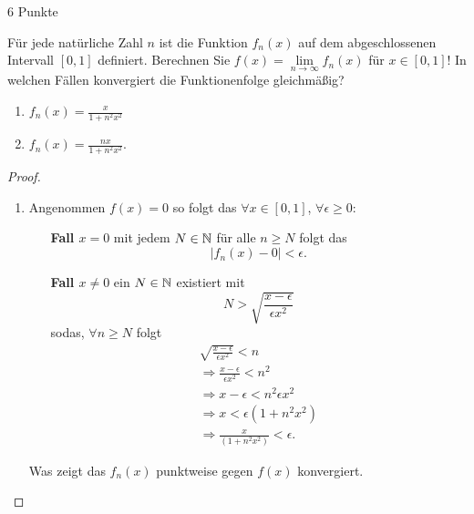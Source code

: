 \documentclass{problemset}
\author{Michael van Straten}
\begin{document}
\maketitle

\begin{problem}{6 Punkte}

Für jede natürliche Zahl $n$ ist die Funktion $f_n(x)$ auf dem abgeschlossenen
Intervall $[0, 1]$ definiert. Berechnen Sie $f(x) = \lim\limits_{n \to \infty}
f_n(x)$ für $x \in [0, 1]$! In welchen Fällen konvergiert die Funktionenfolge
gleichmäßig?

\begin{enumerate}
    \item $f_n(x) = \frac{x}{1 + n^2x^2}$
    \item $f_n(x) = \frac{nx}{1 + n^2x^2}$.
\end{enumerate}

\begin{proof}
    \leavevmode
    \begin{enumerate}
        \item Angenommen \(f(x) = 0\) so folgt das \(\forall x \in
              \left[0,1\right]\), \(\forall \epsilon \ge 0\):
              \begin{itemize}
                  \item [\textbf{Fall \(x = 0\)}]
                        mit jedem \(N \in \mathbb{N}\) für alle \(n \ge N\) folgt das \[
                            |f_n(x) - 0| < \epsilon.
                        \]
                  \item [\textbf{Fall \(x \neq 0\)}]
                        ein \(N \in \mathbb{N}\) existiert mit \[
                            N > \sqrt{\frac{x - \epsilon}{\epsilon x^2}}
                        \] sodas, \(\forall n \ge N\) folgt
                        \begin{align*}
                            \sqrt{\frac{x - \epsilon}{\epsilon x^2}} < n        \\
                            \Rightarrow \frac{x - \epsilon}{\epsilon x^2} < n^2 \\
                            \Rightarrow x - \epsilon < n^2 \epsilon x^2         \\
                            \Rightarrow x < \epsilon (1 + n^2 x^2)              \\
                            \Rightarrow \frac{x}{(1 + n^2 x^2)} < \epsilon.
                        \end{align*}
              \end{itemize}
              Was zeigt das \(f_n(x)\) punktweise gegen \(f(x)\) konvergiert.


\end{enumerate}
\end{proof}
\end{problem}
\end{document}
